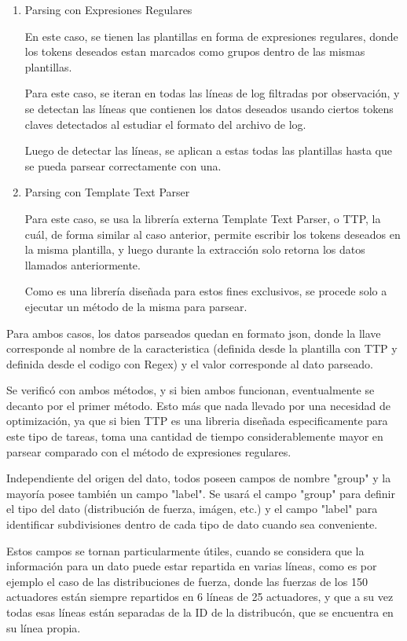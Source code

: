 \begin{enumerate}

    \item{Parsing con Expresiones Regulares}
    
    En este caso, se tienen las plantillas en forma de expresiones regulares, donde los tokens deseados estan marcados como grupos dentro de las mismas plantillas.

    Para este caso, se iteran en todas las líneas de log filtradas por observación, y se detectan las líneas que contienen los datos deseados usando ciertos tokens claves detectados al estudiar el formato del archivo de log.

    Luego de detectar las líneas, se aplican a estas todas las plantillas hasta que se pueda parsear correctamente con una.

    \item{Parsing con Template Text Parser}

    Para este caso, se usa la librería externa Template Text Parser, o TTP, la cuál, de forma similar al caso anterior, permite escribir los tokens deseados en la misma plantilla, y luego durante la extracción solo retorna los datos llamados anteriormente.

    Como es una librería diseñada para estos fines exclusivos, se procede solo a ejecutar un método de la misma para parsear.

\end{enumerate}

Para ambos casos, los datos parseados quedan en formato json, donde la llave corresponde al nombre de la caracteristica (definida desde la plantilla con TTP y definida desde el codigo con Regex) y el valor corresponde al dato parseado.

Se verificó con ambos métodos, y si bien ambos funcionan, eventualmente se decanto por el primer método. Esto más que nada llevado por una necesidad de optimización, ya que si bien TTP es una libreria diseñada especificamente para este tipo de tareas, toma una cantidad de tiempo considerablemente mayor en parsear comparado con el método de expresiones regulares.

Independiente del origen del dato, todos poseen campos de nombre "group" y la mayoría posee también un campo "label". Se usará el campo "group" para definir el tipo del dato (distribución de fuerza, imágen, etc.) y el campo "label" para identificar subdivisiones dentro de cada tipo de dato cuando sea conveniente.

Estos campos se tornan particularmente útiles, cuando se considera que la información para un dato puede estar repartida en varias líneas, como es por ejemplo el caso de las distribuciones de fuerza, donde las fuerzas de los 150 actuadores están siempre repartidos en 6 líneas de 25 actuadores, y que a su vez todas esas líneas están separadas de la ID de la distribucón, que se encuentra en su línea propia.

